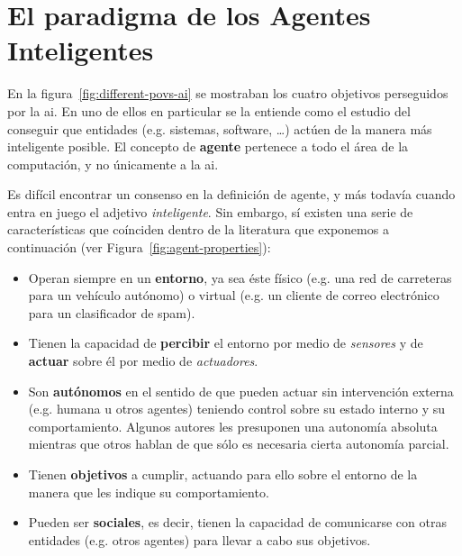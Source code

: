 \section{El paradigma de los Agentes Inteligentes}
\label{ch:ci:s:agent-concept}

En la figura~\ref{fig:different-povs-ai} se mostraban los cuatro objetivos perseguidos por la \gls{ai}. En uno de ellos en particular se la entiende como el estudio del conseguir que entidades (e.g. sistemas, software, \ldots) actúen de la manera más inteligente posible. El concepto de \textbf{agente} pertenece a todo el área de la computación, y no únicamente a la \gls{ai}.

Es difícil encontrar un consenso en la definición de agente, y más todavía cuando entra en juego el adjetivo \textit{inteligente}. Sin embargo, sí existen una serie de características que coínciden dentro de la literatura que exponemos a continuación (ver Figura~\ref{fig:agent-properties}):

\begin{itemize}
	\item Operan siempre en un \textbf{entorno}, ya sea éste físico (e.g. una red de carreteras para un vehículo autónomo) o virtual (e.g. un cliente de correo electrónico para un clasificador de spam).
	\item Tienen la capacidad de \textbf{percibir} el entorno por medio de \textit{sensores} y de \textbf{actuar} sobre él por medio de \textit{actuadores}.
	\item Son \textbf{autónomos} en el sentido de que pueden actuar sin intervención externa (e.g. humana u otros agentes) teniendo control sobre su estado interno y su comportamiento. Algunos autores les presuponen una autonomía absoluta mientras que otros hablan de que sólo es necesaria cierta autonomía parcial.
	\item Tienen \textbf{objetivos} a cumplir, actuando para ello sobre el entorno de la manera que les indique su comportamiento.
	\item Pueden ser \textbf{sociales}, es decir, tienen la capacidad de comunicarse con otras entidades (e.g. otros agentes) para llevar a cabo sus objetivos.
\end{itemize}

